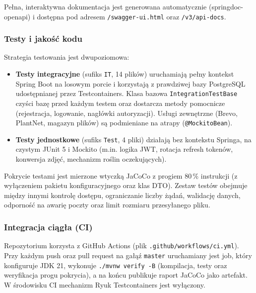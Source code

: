 \documentclass[12pt,a4paper]{article}
\begin{document}
Pe\l{}na, interaktywna dokumentacja jest generowana automatycznie (springdoc-openapi) i dost\k{e}pna pod adresem \texttt{/swagger-ui.html} oraz \texttt{/v3/api-docs}.

\subsubsection{Testy i jako\'s\'c kodu}

Strategia testowania jest dwupoziomowa:

\begin{itemize}[label=\textbullet, leftmargin=1.5cm]
    \item \textbf{Testy integracyjne} (sufiks \texttt{IT}, 14 plik\'ow) uruchamiaj\k{a} pe\l{}ny kontekst Spring Boot na losowym porcie i korzystaj\k{a} z prawdziwej bazy PostgreSQL udost\k{e}pnianej przez Testcontainers. Klasa bazowa \texttt{IntegrationTestBase} czy\'sci baz\k{e} przed ka\.zdym testem oraz dostarcza metody pomocnicze (rejestracja, logowanie, nag\l{}\'owki autoryzacji). Us\l{}ugi zewn\k{e}trzne (Brevo, PlantNet, magazyn plik\'ow) s\k{a} podmieniane na atrapy (\texttt{@MockitoBean}).
    \item \textbf{Testy jednostkowe} (sufiks \texttt{Test}, 4 pliki) dzia\l{}aj\k{a} bez kontekstu Springa, na czystym JUnit 5 i Mockito (m.in. logika JWT, rotacja refresh token\'ow, konwersja zdj\k{e}\'c, mechanizm ro\'slin oczekuj\k{a}cych).
\end{itemize}

Pokrycie testami jest mierzone wtyczk\k{a} JaCoCo z progiem 80\,\% instrukcji (z wy\l{}\k{a}czeniem pakietu konfiguracyjnego oraz klas DTO). Zestaw test\'ow obejmuje mi\k{e}dzy innymi kontrol\k{e} dost\k{e}pu, ograniczanie liczby \.z\k{a}da\'n, walidacj\k{e} danych, odporno\'s\'c na awari\k{e} poczty oraz limit rozmiaru przesy\l{}anego pliku.

\subsubsection{Integracja ci\k{a}g\l{}a (CI)}

Repozytorium korzysta z GitHub Actions (plik \texttt{.github/workflows/ci.yml}). Przy ka\.zdym push oraz pull request na ga\l{}\k{a}\'z \texttt{master} uruchamiany jest job, kt\'ory konfiguruje JDK 21, wykonuje \texttt{./mvnw verify -B} (kompilacja, testy oraz weryfikacja progu pokrycia), a na ko\'ncu publikuje raport JaCoCo jako artefakt. W \'srodowisku CI mechanizm Ryuk Testcontainers jest wy\l{}\k{a}czony.
\end{document}
